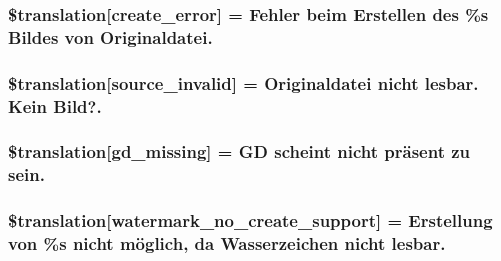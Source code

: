 \subsubsection[{\$translation}]{\setlength{\rightskip}{0pt plus 5cm}\$translation\mbox{[}\textquotesingle{}create\+\_\+error\textquotesingle{}\mbox{]} = \textquotesingle{}Fehler beim Erstellen des \%s Bildes von Originaldatei.\textquotesingle{}}\label{class_8upload_8de___d_e_8php_a53013ce9255c4e1849098ddd9fdb2b3f}
\hypertarget{class_8upload_8de___d_e_8php_a6ab0a660b457eaf2d3434b225449fdd6}{}
\subsubsection[{\$translation}]{\setlength{\rightskip}{0pt plus 5cm}\$translation\mbox{[}\textquotesingle{}source\+\_\+invalid\textquotesingle{}\mbox{]} = \textquotesingle{}Originaldatei nicht lesbar. Kein Bild?.\textquotesingle{}}\label{class_8upload_8de___d_e_8php_a6ab0a660b457eaf2d3434b225449fdd6}
\hypertarget{class_8upload_8de___d_e_8php_a7f3dfcc0db4bbc0f2e7210c439798e56}{}
\subsubsection[{\$translation}]{\setlength{\rightskip}{0pt plus 5cm}\$translation\mbox{[}\textquotesingle{}gd\+\_\+missing\textquotesingle{}\mbox{]} = \textquotesingle{}G\+D scheint nicht präsent zu sein.\textquotesingle{}}\label{class_8upload_8de___d_e_8php_a7f3dfcc0db4bbc0f2e7210c439798e56}
\hypertarget{class_8upload_8de___d_e_8php_a82d5853430ab72dc1f9799ec36144cc6}{}
\subsubsection[{\$translation}]{\setlength{\rightskip}{0pt plus 5cm}\$translation\mbox{[}\textquotesingle{}watermark\+\_\+no\+\_\+create\+\_\+support\textquotesingle{}\mbox{]} = \textquotesingle{}Erstellung von \%s nicht möglich, da Wasserzeichen nicht lesbar.\textquotesingle{}}\label{class_8upload_8de___d_e_8php_a82d5853430ab72dc1f9799ec36144cc6}
\hypertarget{class_8upload_8de___d_e_8php_aabca0b65dadbc6184415c16375f284ca}{}
